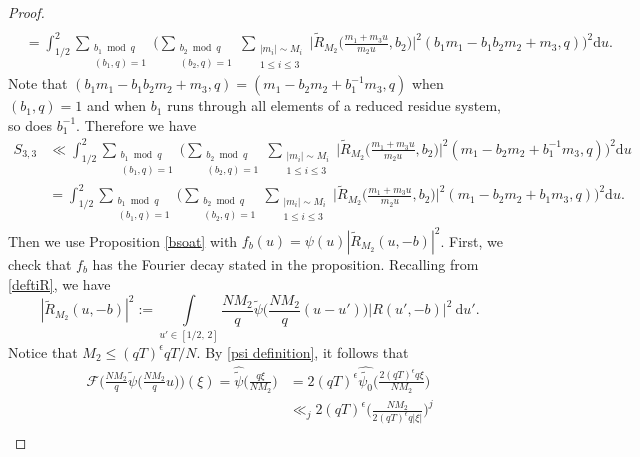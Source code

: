\documentclass[12pt]{amsart}
\theoremstyle{definition}
\theoremstyle{plain}
\theoremstyle{remark}
\numberwithin{equation}{section}
\numberwithin{theorem}{section}
\numberwithin{equation}{section}
\begin{document}
\begin{proof}
\begin{align*}
			\\
			&= \int_{1/2}^{2}\sum_{\substack{b_1 \bmod q \\ (b_{1}, q)=1 }}\bigg(\sum_{\substack{b_2 \bmod q \\ (b_{2}, q)=1 }}\sum_{\substack{|m_{i}|\sim M_{i} \\ 1\leq i \leq 3}}\bigg|\tilde{R}_{M_{2}}\bigg(\frac{m_{1}+m_{3}u}{m_{2}u}, b_{2}\bigg)
			\bigg|^{2}(b_{1}m_{1}-b_{1}b_{2}m_{2}+m_{3},q)\bigg)^{2}\mathrm{d}u.
		\end{align*}
		Note that $(b_{1}m_{1}-b_{1}b_{2}m_{2}+m_{3},q)=(m_{1}-b_{2}m_{2}+b_{1}^{-1}m_{3}, q)$ when $(b_{1}, q)=1$ and when $b_{1}$ runs through all elements of a reduced residue system, so does $b_{1}^{-1}$. Therefore we have
		\begin{align*}
			S_{3,3}&\ll  \int_{1/2}^{2}\sum_{\substack{b_1 \bmod q \\ (b_{1}, q)=1 }}\bigg(\sum_{\substack{b_2 \bmod q \\ (b_{2}, q)=1 }}\sum_{\substack{|m_{i}|\sim M_{i} \\ 1\leq i \leq 3}}\bigg|\tilde{R}_{M_{2}}\bigg(\frac{m_{1}+m_{3}u}{m_{2}u}, b_{2}\bigg)
			\bigg|^{2}(m_{1}-b_{2}m_{2}+b_{1}^{-1}m_{3},q)\bigg)^{2}\mathrm{d}u
			\\
			&=\int_{1/2}^{2}\sum_{\substack{b_1 \bmod q \\ (b_{1}, q)=1 }}\bigg(\sum_{\substack{b_2 \bmod q \\ (b_{2}, q)=1 }}\sum_{\substack{|m_{i}|\sim M_{i} \\ 1\leq i \leq 3}}\bigg|\tilde{R}_{M_{2}}\bigg(\frac{m_{1}+m_{3}u}{m_{2}u}, b_{2}\bigg)
			\bigg|^{2}(m_{1}-b_{2}m_{2}+b_{1}m_{3},q)\bigg)^{2}\mathrm{d}u.
		\end{align*}
		Then we use Proposition \ref{bsoat} with $f_{b}(u)=\psi(u)|\tilde{R}_{M_{2}}(u, -b)|^{2}$. First, we check that $f_{b}$ has the Fourier decay stated in the proposition. Recalling from \eqref{deftiR}, we have 
		\[
		|\tilde{R}_{M_{2}}(u, -b)|^{2}:= \int\limits_{ u' \in [1/2,\, 2]}\frac{NM_{2}}{q}\tilde{\psi}\bigg(\frac{NM_{2}}{q}(u-u')\bigg)| R(u', -b)|^{2}
		\:\mathrm{d}u' .
		\]
		Notice that $M_{2}\leq (qT)^{\epsilon}qT/N$. By \eqref{psi definition}, it follows that 
		\begin{align*}
			\mathcal{F}\bigg(\frac{NM_{2}}{q}\tilde{\psi}\bigg(\frac{NM_{2}}{q}u\bigg)\bigg)(\xi)=\hat{\tilde{\psi}}\bigg(\frac{q\xi}{NM_{2}}\bigg)&=2(qT)^{\epsilon}\hat{\tilde{\psi_{0}}}\bigg(\frac{2(qT)^{\epsilon}q\xi}{NM_{2}}\bigg)
			\\
			&\ll_{j}2(qT)^{\epsilon}\bigg(\frac{NM_{2}}{2(qT)^{\epsilon}q|\xi|}\bigg)^{j} \\

\end{align*}
\end{proof}
\end{document}
